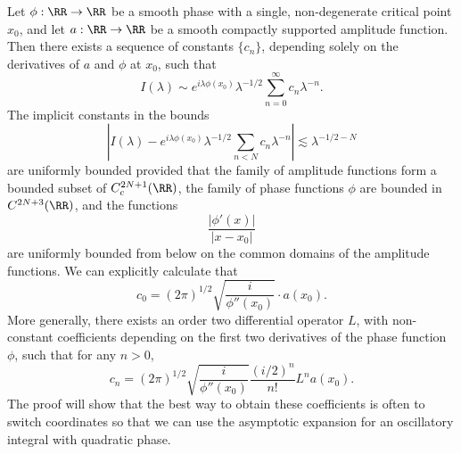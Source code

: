 \begin{theorem}
  Let $\phi: \RR \to \RR$ be a smooth phase with a single, non-degenerate critical point $x_0$, and let $a: \RR \to \RR$ be a smooth compactly supported amplitude function. Then there exists a sequence of constants $\{ c_n \}$, depending solely on the derivatives of $a$ and $\phi$ at $x_0$, such that
  \[ I(\lambda) \sim e^{i \lambda \phi(x_0)} \lambda^{-1/2} \sum_{n = 0}^\infty c_n \lambda^{-n}. \]
  The implicit constants in the bounds
  \[ \left| I(\lambda) - e^{i \lambda \phi(x_0)} \lambda^{-1/2} \sum_{n < N} c_n \lambda^{-n} \right| \lesssim \lambda^{-1/2 - N} \]
  are uniformly bounded provided that the family of amplitude functions form a bounded subset of $C_c^{2N+1}(\RR)$, the family of phase functions $\phi$ are bounded in $C^{2N+3}(\RR)$, and the functions
  \[ \frac{|\phi'(x)|}{|x - x_0|} \]
  are uniformly bounded from below on the common domains of the amplitude functions. We can explicitly calculate that
  \[ c_0 = (2 \pi)^{1/2} \sqrt{ \frac{i}{\phi''(x_0)} } \cdot a(x_0). \]
  More generally, there exists an order two differential operator $L$, with non-constant coefficients depending on the first two derivatives of the phase function $\phi$, such that for any $n > 0$,
  \[ c_n = (2\pi)^{1/2} \sqrt{ \frac{i}{\phi''(x_0)} } \frac{(i/2)^n}{n!} L^n a(x_0). \]
  The proof will show that the best way to obtain these coefficients is often to switch coordinates so that we can use the asymptotic expansion for an oscillatory integral with quadratic phase.
\end{theorem}
